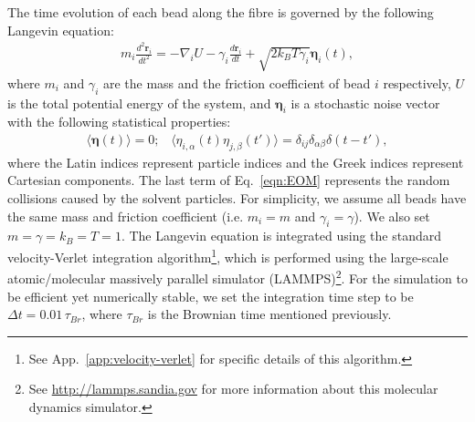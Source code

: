 \documentclass[12pt]{article}
\begin{document}
The time evolution of each bead along the fibre is governed by the following Langevin equation:
\begin{eqnarray}
\label{eqn:EOM}
m_i\frac{d^2\bm{r}_i}{dt^2} = - \nabla_i U - \gamma_i \frac{d\bm{r}_i}{dt} + \sqrt{2k_BT\gamma_i}\bm{\eta}_i(t),
\end{eqnarray}
where $m_i$ and $\gamma_i$ are the mass and the friction coefficient of bead $i$ respectively, $U$ is the total potential energy of the system, and $\bm{\eta}_i$ is a stochastic noise vector with the following statistical properties:
\begin{eqnarray}
\langle\bm{\eta}(t)\rangle = 0;\;\;\; \langle\eta_{i,\alpha}(t)\eta_{j,\beta}(t')\rangle = \delta_{ij}\delta_{\alpha\beta}\delta(t-t'),
\end{eqnarray}
where the Latin indices represent particle indices and the Greek indices represent Cartesian components. The last term of Eq.~\ref{eqn:EOM} represents the random collisions caused by the solvent particles. For simplicity, we assume all beads have the same mass and friction coefficient (i.e. $m_i = m$ and $\gamma_i = \gamma $). We also set $m = \gamma = k_B = T = 1$. The Langevin equation is integrated using the standard velocity-Verlet integration algorithm\footnote{See App.~\ref{app:velocity-verlet} for specific details of this algorithm.}, which is performed using the large-scale atomic/molecular massively parallel simulator (LAMMPS)\footnote{See \url{http://lammps.sandia.gov} for more information about this molecular dynamics simulator.}. For the simulation to be efficient yet numerically stable, we set the integration time step to be $\Delta t = 0.01\,\tau_{Br}$, where $\tau_{Br}$ is the Brownian time mentioned previously.
\end{document}
